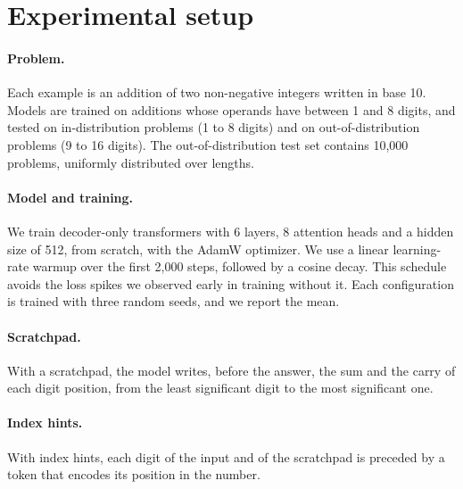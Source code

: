 \section{Experimental setup}
\label{sec:setup}

\paragraph{Problem.} Each example is an addition of two non-negative integers written in base 10. Models are trained on additions whose operands have between 1 and 8 digits, and tested on in-distribution problems (1 to 8 digits) and on out-of-distribution problems (9 to 16 digits). The out-of-distribution test set contains 10{,}000 problems, uniformly distributed over lengths.

\paragraph{Model and training.} We train decoder-only transformers with 6 layers, 8 attention heads and a hidden size of 512, from scratch, with the AdamW optimizer. We use a linear learning-rate warmup over the first 2{,}000 steps, followed by a cosine decay. This schedule avoids the loss spikes we observed early in training without it. Each configuration is trained with three random seeds, and we report the mean.

\paragraph{Scratchpad.} With a scratchpad, the model writes, before the answer, the sum and the carry of each digit position, from the least significant digit to the most significant one.

\paragraph{Index hints.} With index hints, each digit of the input and of the scratchpad is preceded by a token that encodes its position in the number.
